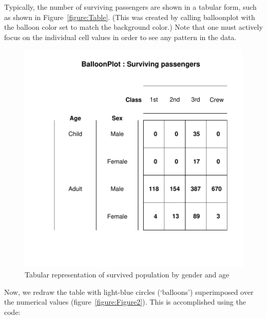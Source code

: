 \documentclass[a4paper]{report}
\begin{document}
\begin{article}


Typically, the number of surviving passengers are shown in a tabular
form, such as shown in Figure~\ref{figure:Table}.  (This was created
by calling balloonplot with the balloon color set to match the
background color.)  Note that one must actively focus on the
individual cell values in order to see any pattern in the data.

\begin{figure}
\includegraphics[width=\textwidth]{Figure1.pdf}
\caption{\label{figure:Figure1}
Tabular representation of survived population by gender and age}
\end{figure}


Now, we redraw the table with light-blue circles (`balloons')
superimposed over the numerical values
(figure~\ref{figure:Figure2}).  This is accomplished using the code:


\end{article}
\end{document}
